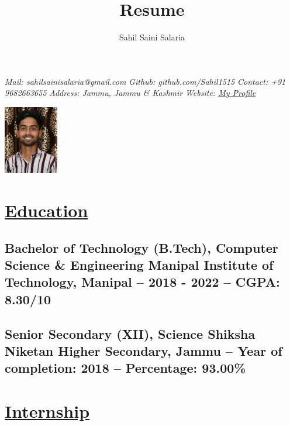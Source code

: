 \documentclass{article}
\makeatletter
\renewcommand{\maketitle}{
    \begin{flushleft}        
        {\huge\rmfamily
        \theauthor}\newline
        \vspace{0.1em}
        \textit{Mail: sahilsainisalaria@gmail.com }  \newline  
        \textit{ Github: github.com/Sahil1515 }  \newline 
        \textit{ Contact: +91 9682663655 }  \newline 
        \textit{ Address: Jammu, Jammu \& Kashmir }  \newline 
        \textit{ Website:  \href{https://sahil1515.github.io/My-Website/}{My Profile}
        }  \newline 
        
       

    \end{flushleft}
}
\makeatother
\begin{document}
\begin{multicols}{2}
    \title{Resume}
    \author{Sahil Saini Salaria}
    \maketitle

    \begin{flushright}
        \includegraphics[height=3cm]{../images/Sahil.jpeg}
    \end{flushright}

\end{multicols}


\section{\underline{Education}}

\subsection{\textbf{Bachelor of Technology (B.Tech), Computer Science \& Engineering}\newline
    \textmd{Manipal Institute of Technology, Manipal --  2018 - 2022 -- CGPA: 8.30/10}}

\subsection{\textbf{Senior Secondary (XII), Science}\newline
    \textmd{ Shiksha Niketan Higher Secondary, Jammu -- Year of completion: 2018 --  Percentage: 93.00\%}}


\section{\underline{Internship}}
\end{document}
